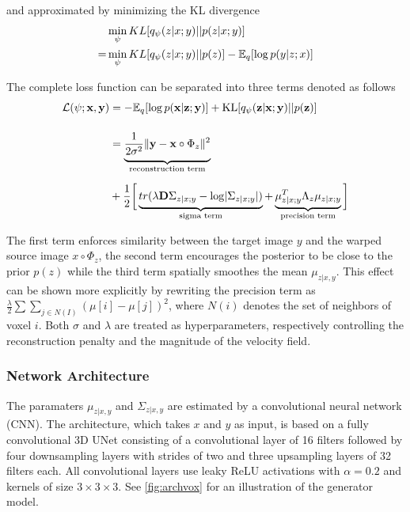 and approximated by minimizing the KL divergence
\begin{equation}
	\begin{split}
		  &\min_\psi KL [ q_\psi(z | x; y) || p(z | x; y) ] \\
		= &\min_\psi KL [ q_\psi(z | x; y) || p(z) ] - \mathbb{E}_q [ \log p(y | z; x) ]
	\end{split}
\end{equation}

The complete loss function can be separated into three terms denoted as follows
\begin{equation} \label{eq:voxloss}
	\begin{split}
		\mathcal{L}(\psi; \mathbf{x}, \mathbf{y})
		& = -\E_{q}[ \log p( \mathbf{x} | \mathbf{z}; \mathbf{y} ) ]
		+ \text{KL} [ q_{\psi} ( \mathbf{z} | \mathbf{x} ; \mathbf{y} ) || p ( \mathbf{z} ) ] \\[12pt]
		& = \underbrace{
			\frac{1}{2 \sigma^2} \norm{\mathbf{y} - \mathbf{x} \circ \Phi_{z}}^{2} \vphantom{\frac{1}{2_{2_2}}}
		}_{\text{reconstruction term}} \\[6pt]
		& + \frac{1}{2} \bigg[
		\underbrace{
			tr( \lambda \mathbf{D} \Sigma_{z | x; y} - \log \abs{ \Sigma_{z | x; y} } ) \vphantom{\mu_{z | x; y}^{T}}
		}_{\text{sigma term}} +
		\underbrace{
			\mu_{z | x; y}^{T} \Lambda_{z} \mu_{z | x; y}
		}_{\text{precision term}} \bigg]
	\end{split}
\end{equation}

The first term enforces similarity between the target image $y$ and the warped source image $x \circ \Phi_z$, the second term encourages the posterior to be close to the prior $p(z)$ while the third term spatially smoothes the mean $\mu_{z | x, y}$. This effect can be shown more explicitly by rewriting the precision term as $ { \frac{\lambda}{2} \sum \sum_{j \in N(I)} ( \mu[i] - \mu[j])^{2} } $, where $N(i)$ denotes the set of neighbors of voxel $i$. Both $\sigma$ and $\lambda$ are treated as hyperparameters, respectively controlling the reconstruction penalty and the magnitude of the velocity field.

\subsubsection*{Network Architecture}
The paramaters $\mu_{z | x, y}$ and $\Sigma_{z | x, y}$ are estimated by a convolutional neural network (CNN). The architecture, which takes $x$ and $y$ as input, is based on a fully convolutional 3D UNet consisting of a convolutional layer of 16 filters followed by four downsampling layers with strides of two and three upsampling layers of 32 filters each. All convolutional layers use leaky ReLU activations with $\alpha = 0.2$ and kernels of size $3\times3\times3$. See \autoref{fig:archvox} for an illustration of the generator model.

